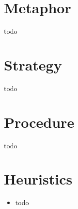\documentclass[a4paper, 11pt]{article}
\begin{document}
\section{Metaphor}
\label{sec:metaphor}
todo

\section{Strategy}
\label{sec:strategy}
todo

\section{Procedure}
\label{sec:procedure}
todo

\section{Heuristics}
\label{sec:heuristics}
\begin{itemize}
	\item todo
\end{itemize}
\end{document}
